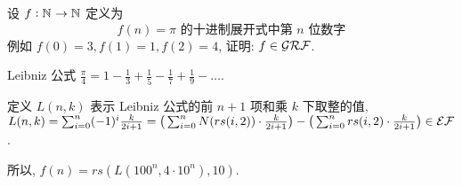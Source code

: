 \begin{problem}
设 $f : \mathbb{N}^{} \to \mathbb{N}^{}$ 定义为
\[
f(n) = \text{$\pi$ 的十进制展开式中第 $n$ 位数字}
\]
例如 $f(0)=3, f(1)=1,f(2)=4$, 证明: $f \in \mathcal{GRF}$.
\end{problem}

\begin{solution}
Leibniz 公式 $\frac{\pi}{4} = 1 - \frac{1}{3} + \frac{1}{5} - \frac{1}{7} + \frac{1}{9} - \dots$.

定义 $L(n,k)$ 表示 Leibniz 公式的前 $n+1$ 项和乘 $k$ 下取整的值, $L(n,k) = \sum_{i=0}^n (-1)^{i} \frac{k}{2i+1} = \big (\sum_{i=0}^n N(rs(i, 2)) \cdot \frac{k}{2i+1} \big) - \big(\sum_{i=0}^n rs(i, 2) \cdot \frac{k}{2i+1} \big) \in \mathcal{EF}$.

所以, $f(n) = rs(L(100^n, 4 \cdot 10^n), 10)$.
\end{solution}